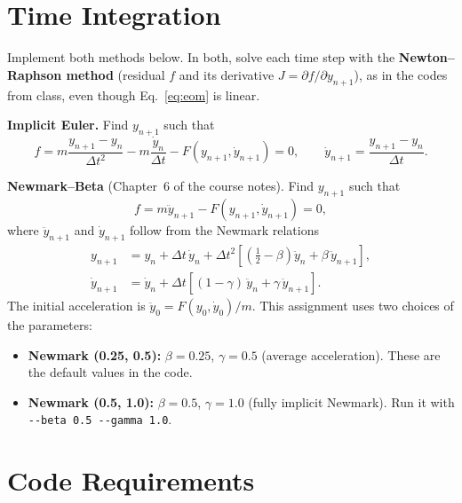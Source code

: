 \documentclass[letterpaper,11pt]{article}
\begin{document}
\section*{Time Integration}

Implement both methods below. In both, solve each time step with the \textbf{Newton--Raphson method} (residual $f$ and its derivative $J = \partial f / \partial y_{n+1}$), as in the codes from class, even though Eq.~\eqref{eq:eom} is linear.

\textbf{Implicit Euler.} Find $y_{n+1}$ such that
\begin{equation}
f = m \frac{y_{n+1} - y_n}{\Delta t^2} - m \frac{\dot{y}_n}{\Delta t} - F\!\left(y_{n+1}, \dot{y}_{n+1}\right) = 0, \qquad \dot{y}_{n+1} = \frac{y_{n+1} - y_n}{\Delta t}.
\end{equation}

\textbf{Newmark--Beta} (Chapter~6 of the course notes). Find $y_{n+1}$ such that
\begin{equation}
f = m \ddot{y}_{n+1} - F\!\left(y_{n+1}, \dot{y}_{n+1}\right) = 0,
\end{equation}
where $\ddot{y}_{n+1}$ and $\dot{y}_{n+1}$ follow from the Newmark relations
\begin{align}
y_{n+1} &= y_n + \Delta t\, \dot{y}_n + \Delta t^2 \left[ \left( \tfrac{1}{2} - \beta \right) \ddot{y}_n + \beta\, \ddot{y}_{n+1} \right], \\
\dot{y}_{n+1} &= \dot{y}_n + \Delta t \left[ (1 - \gamma)\, \ddot{y}_n + \gamma\, \ddot{y}_{n+1} \right].
\end{align}
The initial acceleration is $\ddot{y}_0 = F(y_0, \dot{y}_0) / m$. This assignment uses two choices of the parameters:
\begin{itemize}
    \item \textbf{Newmark (0.25, 0.5):} $\beta = 0.25$, $\gamma = 0.5$ (average acceleration). These are the default values in the code.
    \item \textbf{Newmark (0.5, 1.0):} $\beta = 0.5$, $\gamma = 1.0$ (fully implicit Newmark). Run it with \texttt{-{}-beta 0.5 -{}-gamma 1.0}.
\end{itemize}

\section*{Code Requirements}
\end{document}
